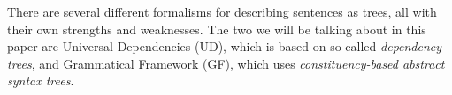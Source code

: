 





There are several different formalisms for describing sentences as trees, all with their own strengths and weaknesses.
The two we will be talking about in this paper are Universal Dependencies (UD), which is based on so called \emph{dependency trees}, and Grammatical Framework (GF), which uses \emph{constituency-based abstract syntax trees}.









